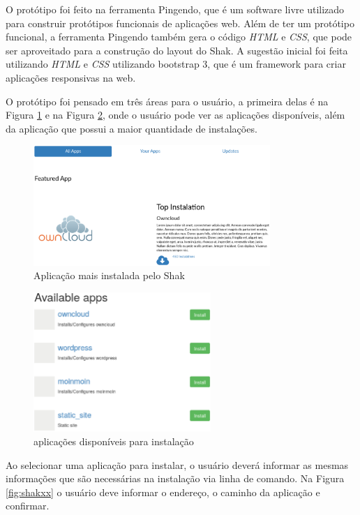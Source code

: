 O protótipo foi feito
na ferramenta Pingendo, que é um software livre utilizado para construir
protótipos funcionais de aplicações web. Além de ter um protótipo funcional, a 
ferramenta Pingendo
também gera o código \textit{HTML} e \textit{CSS}, que pode ser aproveitado para 
a construção do layout do Shak. A sugestão inicial foi feita utilizando \textit{HTML} e \textit{CSS} utilizando bootstrap 3, que é um framework para criar aplicações responsivas 
na web. 

O protótipo foi pensado em três áreas para o usuário, a primeira delas é na Figura
\ref{fig:shakx1} e na Figura \ref{fig:shakx1.2}, onde
o usuário pode ver as aplicações disponíveis, além da aplicação que possui a maior
quantidade de instalações.

\begin{figure}[H]
  \centering
  \includegraphics[width=0.8\textwidth]
      {figuras/shak1}
      \caption{Aplicação mais instalada pelo Shak}
  \label{fig:shakx1}
\end{figure}

\begin{figure}[H]
  \centering
  \includegraphics[width=0.6\textwidth]
      {figuras/shak1-2}
      \caption{aplicações disponíveis para instalação}
  \label{fig:shakx1.2}
\end{figure}

Ao selecionar uma aplicação para instalar, o usuário deverá informar as mesmas
informações que são necessárias na instalação via linha de comando. Na Figura \ref{fig:shakxx}
o usuário deve informar o endereço, o caminho da aplicação e confirmar.

